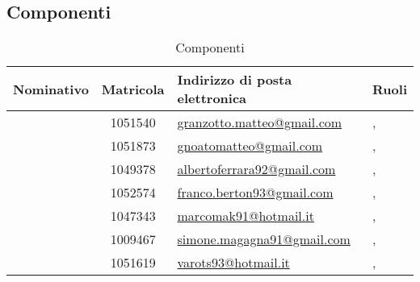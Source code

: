 \subsection{Componenti}
\begin{table}[H]
	\begin{center}
		\setlength{\extrarowheight}{\jot}
		\begin{tabular}{|c|c|p{5cm}|p{4.3cm}|}
			\hline
			\textbf{Nominativo} & \textbf{Matricola} & \raggedright \textbf{Indirizzo di posta elettronica} & \textbf{Ruoli} \\[1ex]
			\hline
	 		\GR	& 1051540	& \href{mailto:granzotto.matteo@gmail.com}{granzotto.matteo@gmail.com} 	& \Ver, \Prog 	\\[1ex]
			\hline
			\GN		& 1051873	& \href{mailto:gnoatomatteo@gmail.com}{gnoatomatteo@gmail.com} 			& \Amm, \Prog 	\\[1ex]
			\hline
			\AF		& 1049378	& \href{mailto:albertoferrara92@gmail.com}{albertoferrara92@gmail.com} 	& \Res, \Prog 	\\[1ex]
			\hline
			\FB 		& 1052574	& \href{mailto:franco.berton93@gmail.com}{franco.berton93@gmail.com} 	& \Res, \Prog	\\[1ex]
			\hline
			\MP		& 1047343	& \href{mailto:marcomak91@hotmail.it}{marcomak91@hotmail.it} 			& \Ver, \Prog	\\[1ex]
			\hline
			\SM		& 1009467	& \href{mailto:simone.magagna91@gmail.com}{simone.magagna91@gmail.com} 	& \Amm, \Prog 	\\[1ex]
			\hline
			\MV		& 1051619	& \href{mailto:varots93@hotmail.it}{varots93@hotmail.it} & \Ver, \Prog \\[1ex]
			\hline	
		\end{tabular}
	\end{center}
	\caption{Componenti}
\end{table}

